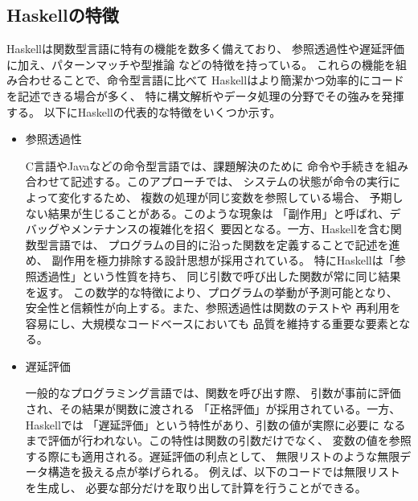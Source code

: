 \documentclass{cssspaper}
\begin{document}
            \subsection{Haskellの特徴}
            Haskellは関数型言語に特有の機能を数多く備えており、
            参照透過性や遅延評価に加え、パターンマッチや型推論
            などの特徴を持っている。
            これらの機能を組み合わせることで、命令型言語に比べて
            Haskellはより簡潔かつ効率的にコードを記述できる場合が多く、
            特に構文解析やデータ処理の分野でその強みを発揮する。
            以下にHaskellの代表的な特徴をいくつか示す。
            \begin{itemize}
                \item 参照透過性
            
                C言語やJavaなどの命令型言語では、課題解決のために
                命令や手続きを組み合わせて記述する。このアプローチでは、
                システムの状態が命令の実行によって変化するため、
                複数の処理が同じ変数を参照している場合、
                予期しない結果が生じることがある。このような現象は
                「副作用」と呼ばれ、デバッグやメンテナンスの複雑化を招く
                要因となる。一方、Haskellを含む関数型言語では、
                プログラムの目的に沿った関数を定義することで記述を進め、
                副作用を極力排除する設計思想が採用されている。
                特にHaskellは「参照透過性」という性質を持ち、
                同じ引数で呼び出した関数が常に同じ結果を返す。
                この数学的な特徴により、プログラムの挙動が予測可能となり、
                安全性と信頼性が向上する。また、参照透過性は関数のテストや
                再利用を容易にし、大規模なコードベースにおいても
                品質を維持する重要な要素となる。

                \item 遅延評価
            
                一般的なプログラミング言語では、関数を呼び出す際、
                引数が事前に評価され、その結果が関数に渡される
                「正格評価」が採用されている。一方、Haskellでは
                「遅延評価」という特性があり、引数の値が実際に必要に
                なるまで評価が行われない。この特性は関数の引数だけでなく、
                変数の値を参照する際にも適用される。遅延評価の利点として、
                無限リストのような無限データ構造を扱える点が挙げられる。
                例えば、以下のコードでは無限リストを生成し、
                必要な部分だけを取り出して計算を行うことができる。


\end{itemize}
\end{document}
